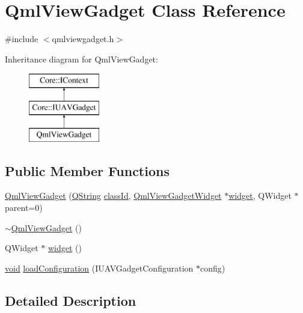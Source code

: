 \hypertarget{class_qml_view_gadget}{\section{\-Qml\-View\-Gadget \-Class \-Reference}
\label{class_qml_view_gadget}
}


{\ttfamily \#include $<$qmlviewgadget.\-h$>$}

\-Inheritance diagram for \-Qml\-View\-Gadget\-:\begin{figure}[H]
\begin{center}
\leavevmode
\includegraphics[height=3.000000cm]{class_qml_view_gadget}
\end{center}
\end{figure}
\subsection*{\-Public \-Member \-Functions}
\begin{DoxyCompactItemize}
\item 
\hyperlink{group___o_p_map_plugin_ga20a7caf16d8ece4d83abc6c96c5a6556}{\-Qml\-View\-Gadget} (\hyperlink{group___u_a_v_objects_plugin_gab9d252f49c333c94a72f97ce3105a32d}{\-Q\-String} \hyperlink{group___core_plugin_ga3878fde66a57220608960bcc3fbeef2c}{class\-Id}, \hyperlink{class_qml_view_gadget_widget}{\-Qml\-View\-Gadget\-Widget} $\ast$\hyperlink{group___o_p_map_plugin_ga7687b494af7a9e5b6f9550ff75f4a98c}{widget}, \-Q\-Widget $\ast$parent=0)
\item 
\hyperlink{group___o_p_map_plugin_gacae7d443d2a8754279dd055180fc2622}{$\sim$\-Qml\-View\-Gadget} ()
\item 
\-Q\-Widget $\ast$ \hyperlink{group___o_p_map_plugin_ga7687b494af7a9e5b6f9550ff75f4a98c}{widget} ()
\item 
\hyperlink{group___u_a_v_objects_plugin_ga444cf2ff3f0ecbe028adce838d373f5c}{void} \hyperlink{group___o_p_map_plugin_ga38c57a339a1bd7d6c6295d9f4fdcd016}{load\-Configuration} (\-I\-U\-A\-V\-Gadget\-Configuration $\ast$config)
\end{DoxyCompactItemize}


\subsection{\-Detailed \-Description}


